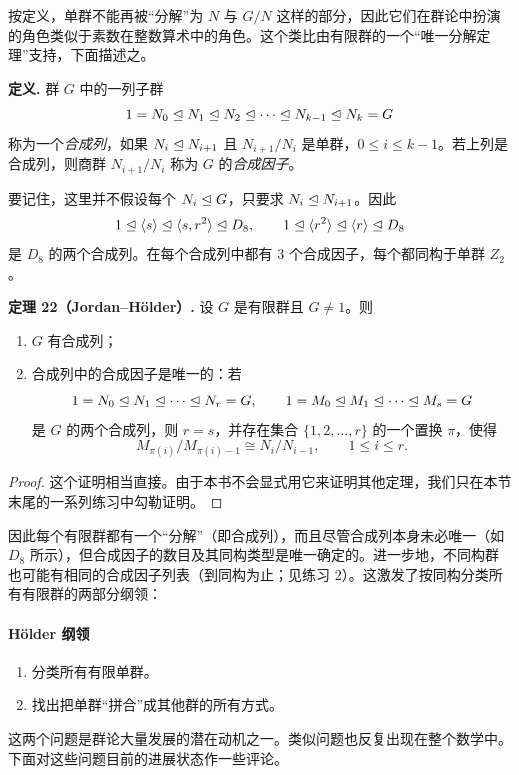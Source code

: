 按定义，单群不能再被“分解”为 $N$ 与 $G/N$ 这样的部分，因此它们在群论中扮演的角色类似于素数在整数算术中的角色。这个类比由有限群的一个“唯一分解定理”支持，下面描述之。

\noindent\textbf{定义.} 群 $G$ 中的一列子群
\[
  1=N_0\trianglelefteq N_1\trianglelefteq N_2\trianglelefteq\cdots\trianglelefteq N_{k-1}\trianglelefteq N_k=G
\]
称为一个\emph{合成列}，如果 $N_i\trianglelefteq N_{i+1}$ 且 $N_{i+1}/N_i$ 是单群，$0\leq i\leq k-1$。若上列是合成列，则商群 $N_{i+1}/N_i$ 称为 $G$ 的\emph{合成因子}。

要记住，这里并不假设每个 $N_i\trianglelefteq G$，只要求 $N_i\trianglelefteq N_{i+1}$。因此
\[
  1\trianglelefteq\langle s\rangle\trianglelefteq\langle s,r^2\rangle\trianglelefteq D_8,
  \qquad
  1\trianglelefteq\langle r^2\rangle\trianglelefteq\langle r\rangle\trianglelefteq D_8
\]
是 $D_8$ 的两个合成列。在每个合成列中都有 $3$ 个合成因子，每个都同构于单群 $Z_2$。

\medskip
\noindent\textbf{定理 22（Jordan--Hölder）.} 设 $G$ 是有限群且 $G\neq1$。则
\begin{enumerate}[label=(\arabic*)]
  \item $G$ 有合成列；
  \item 合成列中的合成因子是唯一的：若
  \[
    1=N_0\trianglelefteq N_1\trianglelefteq\cdots\trianglelefteq N_r=G,
    \qquad
    1=M_0\trianglelefteq M_1\trianglelefteq\cdots\trianglelefteq M_s=G
  \]
  是 $G$ 的两个合成列，则 $r=s$，并存在集合 $\{1,2,\ldots,r\}$ 的一个置换 $\pi$，使得
  \[
    M_{\pi(i)}/M_{\pi(i)-1}\cong N_i/N_{i-1},
    \qquad 1\leq i\leq r.
  \]
\end{enumerate}

\begin{proof}
这个证明相当直接。由于本书不会显式用它来证明其他定理，我们只在本节末尾的一系列练习中勾勒证明。
\end{proof}

因此每个有限群都有一个“分解”（即合成列），而且尽管合成列本身未必唯一（如 $D_8$ 所示），但合成因子的数目及其同构类型是唯一确定的。进一步地，不同构群也可能有相同的合成因子列表（到同构为止；见练习 2）。这激发了按同构分类所有有限群的两部分纲领：

\paragraph{Hölder 纲领}
\begin{enumerate}[label=(\arabic*)]
  \item 分类所有有限单群。
  \item 找出把单群“拼合”成其他群的所有方式。
\end{enumerate}

这两个问题是群论大量发展的潜在动机之一。类似问题也反复出现在整个数学中。下面对这些问题目前的进展状态作一些评论。


